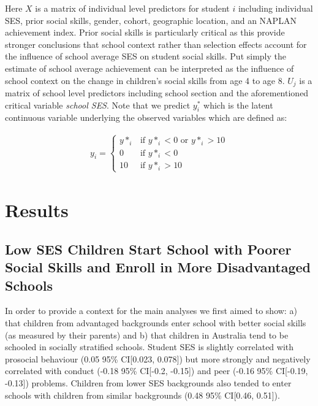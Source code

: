 \documentclass[
  english,
  man]{apa6}
\begin{document}
Here \(X\) is a matrix of individual level predictors for student \(i\) including individual SES, prior social skills, gender, cohort, geographic location, and an NAPLAN achievement index. Prior social skills is particularly critical as this provide stronger conclusions that school context rather than selection effects account for the influence of school average SES on student social skills. Put simply the estimate of school average achievement can be interpreted as the influence of school context on the change in children's social skills from age 4 to age 8. \(U_j\) is a matrix of school level predictors including school section and the aforementioned critical variable \emph{school SES}. Note that we predict \(y^{*}_{i}\) which is the latent continuous variable underlying the observed variables which are defined as:

\[
\begin{split}
y_i =  \begin{cases}      
            y*_{i} & \text{if $y*_{i} < 0$ or $y*_{i} > 10 $}\\      
            0 & \text{if $y*_{i} < 0$}\\      
            10 & \text{if $y*_{i} > 10$}    
        \end{cases}
\end{split}
\]

\hypertarget{results}{%
\section{Results}\label{results}}

\hypertarget{low-ses-children-start-school-with-poorer-social-skills-and-enroll-in-more-disadvantaged-schools}{%
\subsection{Low SES Children Start School with Poorer Social Skills and Enroll in More Disadvantaged Schools}\label{low-ses-children-start-school-with-poorer-social-skills-and-enroll-in-more-disadvantaged-schools}}

In order to provide a context for the main analyses we first aimed to show: a) that children from advantaged backgrounds enter school with better social skills (as measured by their parents) and b) that children in Australia tend to be schooled in socially stratified schools. Student SES is slightly correlated with prosocial behaviour (0.05 95\% CI{[}0.023, 0.078{]}) but more strongly and negatively correlated with conduct (-0.18 95\% CI{[}-0.2, -0.15{]}) and peer (-0.16 95\% CI{[}-0.19, -0.13{]}) problems. Children from lower SES backgrounds also tended to enter schools with children from similar backgrounds (0.48 95\% CI{[}0.46, 0.51{]}).
\end{document}
